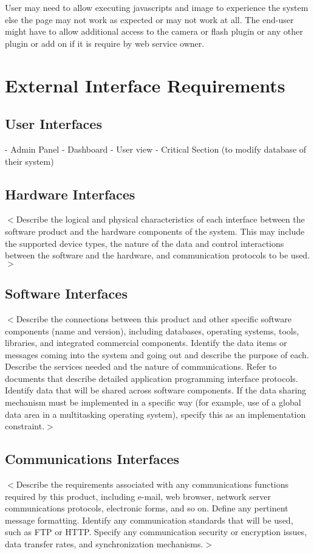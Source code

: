 \documentclass{scrreprt}
\begin{document}
User may need to allow executing javascripts and image to experience the system else the page may not work as expected or may not work at all.
The end-user might have to allow additional access to the camera or flash plugin or any other plugin or add on if it is require by web service owner.
 

\chapter{External Interface Requirements}

\section{User Interfaces}
- Admin Panel
- Dashboard
- User view
- Critical Section (to modify database of their system)

\section{Hardware Interfaces}
$<$Describe the logical and physical characteristics of each interface between 
the software product and the hardware components of the system. This may include 
the supported device types, the nature of the data and control interactions 
between the software and the hardware, and communication protocols to be 
used.$>$

\section{Software Interfaces}
$<$Describe the connections between this product and other specific software 
components (name and version), including databases, operating systems, tools, 
libraries, and integrated commercial components. Identify the data items or 
messages coming into the system and going out and describe the purpose of each.  
Describe the services needed and the nature of communications. Refer to 
documents that describe detailed application programming interface protocols.  
Identify data that will be shared across software components. If the data 
sharing mechanism must be implemented in a specific way (for example, use of a 
global data area in a multitasking operating system), specify this as an 
implementation constraint.$>$

\section{Communications Interfaces}
$<$Describe the requirements associated with any communications functions 
required by this product, including e-mail, web browser, network server 
communications protocols, electronic forms, and so on. Define any pertinent 
message formatting. Identify any communication standards that will be used, such 
as FTP or HTTP. Specify any communication security or encryption issues, data 
transfer rates, and synchronization mechanisms.$>$
\end{document}

